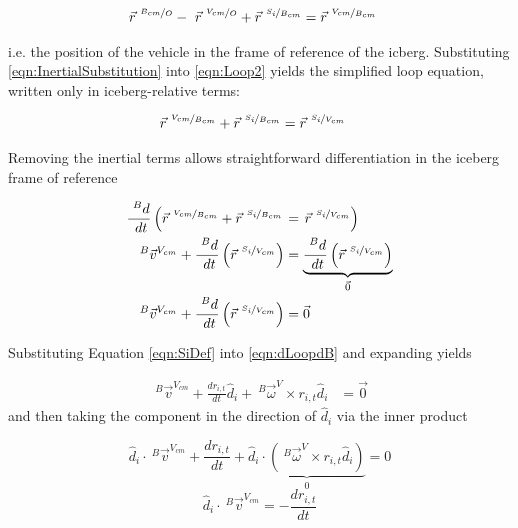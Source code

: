 \begin{align}
\vec{r}^{~\nicefrac{B_{cm}}{O}}  - ~\vec{r}^{~\nicefrac{V_{cm}}{O}} + \vec{r}^{~\nicefrac{S_i}{B_{cm}}} &= \vec{r}^{~\nicefrac{V_{cm}}{B_{cm}}}
\label{eqn:InertialSubstitution}
\end{align}

i.e. the position of the vehicle in the frame of reference of the icberg. Substituting \ref{eqn:InertialSubstitution} into \ref{eqn:Loop2} yields the simplified loop equation, written only in iceberg-relative terms:

\begin{align}
\vec{r}^{~\nicefrac{V_{cm}}{B_{cm}}}+ \vec{r}^{~\nicefrac{S_i}{B_{cm}}} &= \vec{r}^{~\nicefrac{S_i}{V_{cm}}}
\label{eqn:IcebergLoop}
\end{align}

Removing the inertial terms allows straightforward differentiation in the iceberg frame of reference


\begin{align} %
   \frac{~^Bd}{~dt}\left(\vec{r}^{~\nicefrac{V_{cm}}{B_{cm}}}+ \vec{r}^{~\nicefrac{S_i}{B_{cm}}}\right.& =\left. \vec{r}^{~\nicefrac{S_i}{V_{cm}}}\right)\\
   ~^B\vec{v}^{V_{cm}}  + \frac{~^Bd}{~dt}\left(\vec{r}^{~\nicefrac{S_{i}}{V_{cm}}}\right) &= \underbrace{\frac{~^Bd}{~dt}\left(\vec{r}^{~\nicefrac{S_i}{V_{cm}}}\right)}_{\vec{0}} \\
   ~^B\vec{v}^{V_{cm}}  + \frac{~^Bd}{~dt}\left(\vec{r}^{~\nicefrac{S_{i}}{V_{cm}}}\right) &= \vec{0}
   \label{eqn:dLoopdB}
\end{align}

Substituting Equation \ref{eqn:SiDef} into \ref{eqn:dLoopdB} and expanding yields

\begin{align} %
   ~^B\vec{v}^{V_{cm}}  + \frac{dr_{i,t}}{dt}\hat{d}_i + ~^B\vec{\omega}^V \times r_{i,t}\hat{d}_i&= \vec{0}
   \label{eqn:gettingClose}
\end{align}
and then taking the component  in the direction of $\hat{d}_i$ via the inner product

\begin{equation} %
   \hat{d}_i \cdot ~^B\vec{v}^{V_{cm}}  + \frac{dr_{i,t}}{dt} + \underbrace{ \hat{d}_i \cdot \left( ~^B\vec{\omega}^V \times r_{i,t}\hat{d}_i\right)}_{0} = 0
   \label{eqn:bodyVelocity}
   \end{equation}
   \begin{equation}
   \hat{d}_i \cdot ~^B\vec{v}^{V_{cm}} = - \frac{dr_{i,t}}{dt}
   \label{eqn:boom}
\end{equation}

